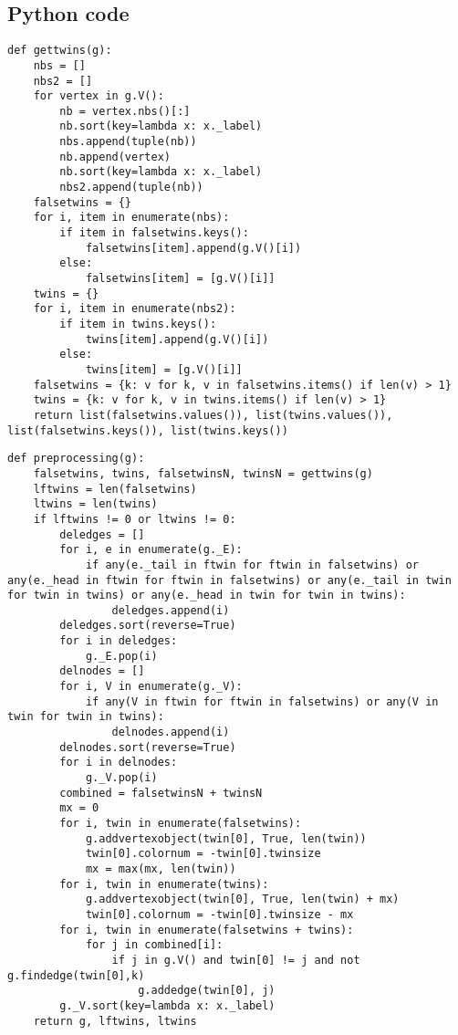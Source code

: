 \documentclass[twoside]{article}
\theoremstyle{definition}
\theoremstyle{plain}
\begin{document}
\begin{appendices}

\section{Python code}
\lstset{language=Python}
\begin{lstlisting}[label={gettwins}]
def gettwins(g):
    nbs = []
    nbs2 = []
    for vertex in g.V():
        nb = vertex.nbs()[:]
        nb.sort(key=lambda x: x._label)
        nbs.append(tuple(nb))
        nb.append(vertex)
        nb.sort(key=lambda x: x._label)
        nbs2.append(tuple(nb))
    falsetwins = {}
    for i, item in enumerate(nbs):
        if item in falsetwins.keys():
            falsetwins[item].append(g.V()[i])
        else:
            falsetwins[item] = [g.V()[i]]
    twins = {}
    for i, item in enumerate(nbs2):
        if item in twins.keys():
            twins[item].append(g.V()[i])
        else:
            twins[item] = [g.V()[i]]
    falsetwins = {k: v for k, v in falsetwins.items() if len(v) > 1}
    twins = {k: v for k, v in twins.items() if len(v) > 1}
    return list(falsetwins.values()), list(twins.values()), list(falsetwins.keys()), list(twins.keys())   
\end{lstlisting}


\begin{lstlisting}[label={preprocessing}]
def preprocessing(g):
	falsetwins, twins, falsetwinsN, twinsN = gettwins(g)
	lftwins = len(falsetwins)
	ltwins = len(twins)
	if lftwins != 0 or ltwins != 0:
		deledges = []
		for i, e in enumerate(g._E):
			if any(e._tail in ftwin for ftwin in falsetwins) or any(e._head in ftwin for ftwin in falsetwins) or any(e._tail in twin for twin in twins) or any(e._head in twin for twin in twins):
				deledges.append(i)
		deledges.sort(reverse=True)
		for i in deledges:
			g._E.pop(i)
		delnodes = []
		for i, V in enumerate(g._V):
			if any(V in ftwin for ftwin in falsetwins) or any(V in twin for twin in twins):
				delnodes.append(i)
		delnodes.sort(reverse=True)
		for i in delnodes:
			g._V.pop(i)
		combined = falsetwinsN + twinsN
		mx = 0
		for i, twin in enumerate(falsetwins):
			g.addvertexobject(twin[0], True, len(twin))
			twin[0].colornum = -twin[0].twinsize
			mx = max(mx, len(twin))
		for i, twin in enumerate(twins):
			g.addvertexobject(twin[0], True, len(twin) + mx)
			twin[0].colornum = -twin[0].twinsize - mx
		for i, twin in enumerate(falsetwins + twins):
			for j in combined[i]:
				if j in g.V() and twin[0] != j and not g.findedge(twin[0],k)
					g.addedge(twin[0], j)
		g._V.sort(key=lambda x: x._label)
	return g, lftwins, ltwins
\end{lstlisting}


\end{appendices}
\end{document}
